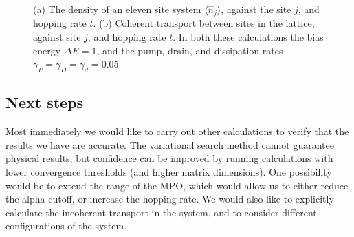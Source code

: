 \begin{figure}[ht!]
	 \hfill
	\caption{\label{fig:fw1-3}(a) The density of an eleven site system \(\langle \hat{n}_{j} \rangle\), against the site \(j\), and hopping rate \(t\). (b) Coherent transport between sites in the lattice, against site \(j\), and hopping rate \(t\). In both these calculations the bias energy \(\Delta E = 1\), and the pump, drain, and dissipation rates \(\gamma_{P} = \gamma_{D} = \gamma_{d} = 0.05\).}
\end{figure}

\subsection{Next steps}
Most immediately we would like to carry out other calculations to verify that the results we have are accurate. The variational search method cannot guarantee physical results, but confidence can be improved by running calculations with lower convergence thresholds (and higher matrix dimensions). One possibility would be to extend the range of the MPO, which would allow us to either reduce the alpha cutoff, or increase the hopping rate. We would also like to explicitly calculate the incoherent transport in the system, and to consider different configurations of the system. 

